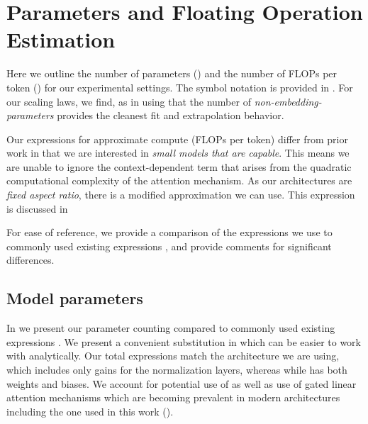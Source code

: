 \section{Parameters and Floating Operation Estimation}
\label{sec:parameters-and-floating-operation-estimation}

Here we outline the number of parameters ()
and the number of FLOPs per token () for our experimental settings.
The symbol notation is provided in .
For our scaling laws, we find, as in \citet{DBLP:journals/corr/abs-2001-08361}
using that the number of \emph{non-embedding-parameters} provides the cleanest fit and extrapolation behavior.

Our expressions for approximate compute (FLOPs per token) differ from prior work in that we are interested in \emph{small models that are capable}.
This means we are unable to ignore the context-dependent term that arises from the quadratic computational complexity of the attention mechanism.
As our architectures are \emph{fixed aspect ratio}, there is a modified approximation we can use.
This expression is discussed in 

For ease of reference, we provide a comparison of the expressions we use to commonly used existing expressions \citep{DBLP:journals/corr/abs-2001-08361,DBLP:journals/corr/abs-2203-15556,DBLP:conf/sc/NarayananSCLPKV21},
and provide comments for significant differences.



\FloatBarrier


\FloatBarrier
\subsection{Model parameters}
\label{ssec:model-parameters}

In  we present our parameter counting compared to commonly used existing expressions \citep{DBLP:journals/corr/abs-2001-08361,DBLP:journals/corr/abs-2203-15556,DBLP:conf/sc/NarayananSCLPKV21}.
We present a convenient substitution in  which can be easier to work with analytically.
Our total expressions match the architecture we are using, which includes only gains for the normalization layers, whereas while \cite{DBLP:conf/sc/NarayananSCLPKV21} has both weights and biases.
We account for potential use of \citep{DBLP:conf/emnlp/AinslieLJZLS23} as well as
use of gated linear attention mechanisms which are becoming prevalent in modern architectures \citep{DBLP:journals/corr/abs-2002-05202}
including the one used in this work ().

